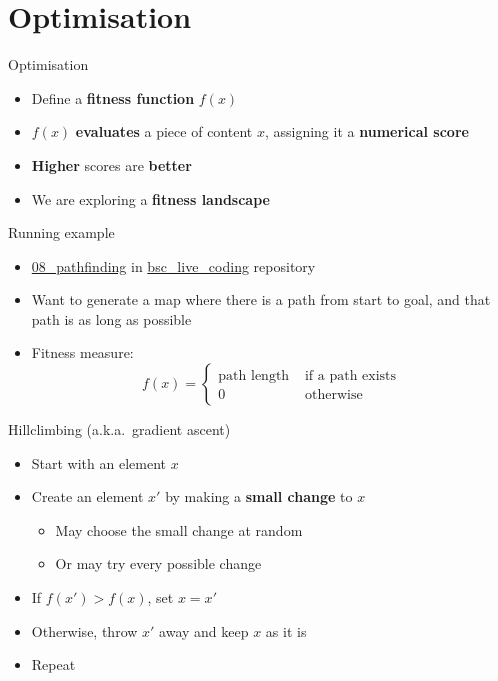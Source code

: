 \part{Optimisation}
\frame{\partpage}

\begin{frame}{Optimisation}
	\begin{itemize}
		\pause\item Define a \textbf{fitness function} $f(x)$
		\pause\item $f(x)$ \textbf{evaluates} a piece of content $x$, assigning it a \textbf{numerical score}
		\pause\item \textbf{Higher} scores are \textbf{better}
		\pause\item We are exploring a \textbf{fitness landscape}
	\end{itemize}
\end{frame}

\begin{frame}{Running example}
	\begin{itemize}
		\pause\item \url{08_pathfinding} in \url{bsc_live_coding} repository
		\pause\item Want to generate a map where there is a path from start to goal,
			and that path is as long as possible
		\pause\item Fitness measure:
		$$ f(x) = \begin{cases}
			\text{path length} & \text{ if a path exists} \\
			0 & \text{ otherwise}
		\end{cases} $$
	\end{itemize}
\end{frame}

\begin{frame}{Hillclimbing (a.k.a.\ gradient ascent)}
	\begin{itemize}
		\pause\item Start with an element $x$
		\pause\item Create an element $x'$ by making a \textbf{small change} to $x$
			\begin{itemize}
				\pause\item May choose the small change at random
				\pause\item Or may try every possible change
			\end{itemize}
		\pause\item If $f(x') > f(x)$, set $x = x'$
		\pause\item Otherwise, throw $x'$ away and keep $x$ as it is
		\pause\item Repeat
	\end{itemize}
\end{frame}

